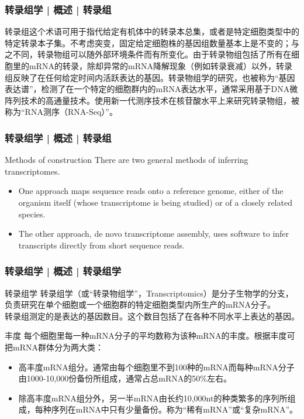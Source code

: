 \begin{frame}
  \frametitle{转录组学 | 概述 | 转录组}
转录组这个术语可用于指代给定有机体中的转录本总集，或者是特定细胞类型中的特定转录本子集。不考虑突变，固定给定细胞株的基因组数量基本上是不变的；与之不同，转录物组可以随外部环境条件而有所变化。由于转录物组包括了所有在细胞里的mRNA的转录，除却异常的mRNA降解现象（例如转录衰减）以外，转录组反映了在任何给定时间内活跃表达的基因。转录物组学的研究，也被称为“基因表达谱”，检测了在一个特定的细胞群内的mRNA表达水平，通常采用基于DNA微阵列技术的高通量技术。使用新一代测序技术在核苷酸水平上来研究转录物组，被称为“RNA测序（RNA-Seq）”。
\end{frame}



\begin{frame}
  \frametitle{转录组学 | 概述 | 转录组}
  \begin{block}{Methods of construction}
    There are two general methods of inferring transcriptomes.
    \begin{itemize}
      \item One approach maps sequence reads onto a reference genome, either of the organism itself (whose transcriptome is being studied) or of a closely related species.
      \item The other approach, de novo transcriptome assembly, uses software to infer transcripts directly from short sequence reads.
    \end{itemize}
  \end{block}
\end{frame}

\begin{frame}
  \frametitle{转录组学 | 概述 | 转录组学}
  \begin{block}{转录组学}
    转录组学（或“转录物组学”，Transcriptomics）是分子生物学的分支，负责研究在单个细胞或一个细胞群的特定细胞类型内所生产的mRNA分子。\\
    \vspace{1em}
转录组测定的是表达的基因数目。这个数目包括了在各种不同水平上表达的基因。\\
\end{block}
\begin{block}{丰度}
每个细胞里每一种mRNA分子的平均数称为该种mRNA的丰度。根据丰度可把mRNA群体分为两大类：
\begin{itemize}
  \item 高丰度mRNA组分。通常由每个细胞里不到100种的mRNA而每种mRNA分子由1000-10,000份备份所组成，通常占总mRNA的50\%左右。
  \item 除高丰度mRNA组分外，另一半mRNA由长约10,000nt的种类繁多的序列所组成，每种序列在mRNA中只有少量备份。称为“稀有mRNA”或“复杂mRNA”。
\end{itemize}
  \end{block}
\end{frame}

